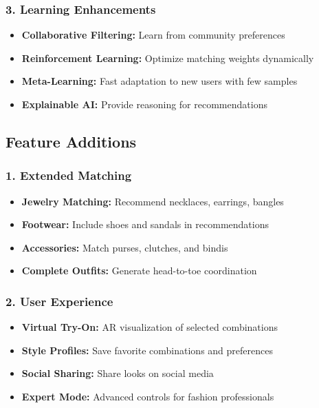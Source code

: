 \documentclass[12pt,a4paper]{report}
\begin{document}
\subsubsection{3. Learning Enhancements}
\begin{itemize}
    \item \textbf{Collaborative Filtering:} Learn from community preferences
    \item \textbf{Reinforcement Learning:} Optimize matching weights dynamically
    \item \textbf{Meta-Learning:} Fast adaptation to new users with few samples
    \item \textbf{Explainable AI:} Provide reasoning for recommendations
\end{itemize}

\subsection{Feature Additions}

\subsubsection{1. Extended Matching}
\begin{itemize}
    \item \textbf{Jewelry Matching:} Recommend necklaces, earrings, bangles
    \item \textbf{Footwear:} Include shoes and sandals in recommendations
    \item \textbf{Accessories:} Match purses, clutches, and bindis
    \item \textbf{Complete Outfits:} Generate head-to-toe coordination
\end{itemize}

\subsubsection{2. User Experience}
\begin{itemize}
    \item \textbf{Virtual Try-On:} AR visualization of selected combinations
    \item \textbf{Style Profiles:} Save favorite combinations and preferences
    \item \textbf{Social Sharing:} Share looks on social media
    \item \textbf{Expert Mode:} Advanced controls for fashion professionals
\end{itemize}
\end{document}
